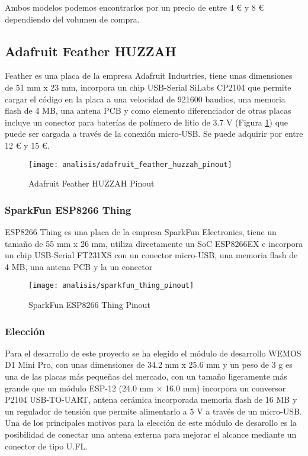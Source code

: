 \documentclass[../proyecto.tex]{subfiles}
\begin{document}
Ambos modelos podemos encontrarlos por un precio de entre 4 € y 8 € dependiendo del volumen de compra.\\

\subsection{Adafruit Feather HUZZAH}

Feather \cite{adafruit_feather_huzzah} es una placa de la empresa Adafruit Industries, tiene unas dimensiones de 51 mm x 23 mm, incorpora un chip USB-Serial SiLabs CP2104 que permite cargar el código en la placa a una velocidad de 921600 baudios, una memoria flash de 4 MB, una antena PCB y como elemento diferenciador de otras placas incluye un conector para baterías de polímero de litio de 3.7 V (Figura \ref{fig:adafruit_feather_huzzah_pinout}) que puede ser cargada a través de la conexión micro-USB. Se puede adquirir por entre 12 € y 15 €.

\begin{figure}[H]
\centering
\texttt{[image: analisis/adafruit\_feather\_huzzah\_pinout]}
\caption{Adafruit Feather HUZZAH Pinout}
\label{fig:adafruit_feather_huzzah_pinout}
\end{figure}

\subsubsection{SparkFun ESP8266 Thing}
ESP8266 Thing \cite{sparkfun_thing_official_page} es una placa de la empresa SparkFun Electronics, tiene un tamaño de 55 mm x 26 mm, utiliza directamente un SoC ESP8266EX e incorpora un chip USB-Serial FT231XS con un conector micro-USB, una memoria flash de 4 MB, una antena PCB y la un conector
\begin{figure}[H]
\centering
\texttt{[image: analisis/sparkfun\_thing\_pinout]}
\caption{SparkFun ESP8266 Thing Pinout}
\label{fig:sparkfun_thing_pinout}
\end{figure}


\subsubsection{Elección}

Para el desarrollo de este proyecto se ha elegido el módulo de desarrollo WEMOS D1 Mini Pro, con unas dimensiones de 34.2 mm x 25.6 mm y un peso de 3 g es una de las placas más pequeñas del mercado, con un tamaño ligeramente más grande que un módulo ESP-12 (24.0 mm × 16.0 mm) incorpora un conversor P2104 USB-TO-UART, antena cerámica incorporada memoria flash de 16 MB y un regulador de tensión que permite alimentarlo a 5 V a través de un micro-USB. Una de los principales motivos para la elección de este módulo de desarollo es la posibilidad de conectar una antena externa para mejorar el alcance mediante un conector de tipo U.FL. \\
\end{document}
